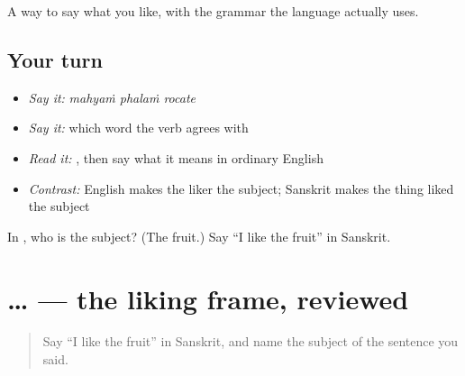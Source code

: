 \begin{grammarlens}[title={What you've built}]
A way to say what you like, with the grammar the language actually uses.
\end{grammarlens}

\subsection*{Your turn}
\begin{itemize}
\raggedright
  \item \emph{Say it:} \emph{mahyaṁ phalaṁ rocate}
  \item \emph{Say it:} which word the verb agrees with
  \item \emph{Read it:} \textbf{  }, then say what it means in ordinary English
  \item \emph{Contrast:} English makes the liker the subject; Sanskrit makes the thing liked the subject
\end{itemize}

\begin{tcolorbox}[breakable,colback=teal!4,colframe=teal!35!black,title={Before you move on}]
In \textbf{  }, who is the subject? (The fruit.) Say \textquotedblleft{}I like the fruit\textquotedblright{} in Sanskrit.
\end{tcolorbox}
\section[\texorpdfstring{\sk{मह्यं} … \sk{रोचते} (mahyaṁ … rocate)}{मह्यं … रोचते (mahyaṁ … rocate)}]{ …  — the liking frame, reviewed}

\label{lesson:SA-R58-likes}



\begin{quote}
Say \textquotedblleft{}I like the fruit\textquotedblright{} in Sanskrit, and name the subject of the sentence you said.
\end{quote}

